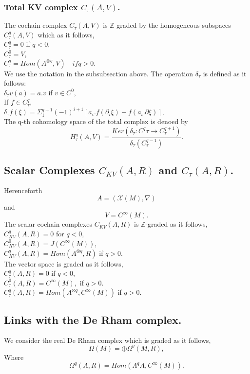 \subsubsection{Total KV complex $C_\tau(A,V)$.}
The cochain complex $C_\tau(A,V)$ is $\mathbb{Z}$-graded by the homogeneous subspaces $C^q_\tau(A,V)$ which as it follows,\\
$C^q_\tau = 0$  if $q < 0$, \\
$C^0_\tau = V$, \\
$C^q_\tau = Hom(A^{\otimes q},V)\quad if q > 0.$\\
We use the notation in the subsubsection above. The operation $\delta_\tau$ is defined as it follows:\\
$\delta_\tau v (a) = a.v$ if  $v\in C^0,$\\
If $f \in C^q_\tau,$\\
$\delta_\tau f(\xi) = \Sigma^{q+1}_1 (-1)^{i+1}[a_i.f(\partial_i\xi) - f(a_i.\partial\xi)]$.\\
The q-th cohomology space of the total complex is denoed by
$$H^q_\tau(A,V) = \frac{Ker(\delta_\tau: C^q\tau \rightarrow C^{q+1}_\tau)}{\delta_\tau(C^{q-1}_\tau)}.$$
\subsection{Scalar Complexes $C_{KV}(A,R)$ and $C_\tau(A,R)$.}
Herenceforth 
$$A = (\mathcal{X}(M),\nabla)$$
and 
$$V = C^\infty(M).$$
The scalar cochain complexes $C_{KV}(A,R)$ is $\mathbb{Z}$-graded as it follows,\\
$C^q_{KV}(A,R) = 0$ for $q < 0$,\\
$C^0_{KV}(A,R) = J(C^\infty(M))$,\\
$C^q_{KV}(A,R) = Hom(A^{\otimes q},R)$ if $q > 0$.\\
The vector space is graded as it follows,\\  
$C^q_\tau(A,R) = 0$ if $q < 0,$\\
$C^0_\tau(A,R)= C^\infty(M),$ if $q > 0$.\\
$C^q_\tau(A,R) = Hom(A^{\otimes q},C^\infty(M))$ if $q > 0$.\\
\subsection{Links with the De Rham complex.}
We consider the real De Rham complex which is graded as it follows,
$$\Omega(M) = \oplus \Omega^q(M,R),$$
Where
$$\Omega^q(A,R) = Hom(\Lambda^qA,C^\infty(M)).$$

